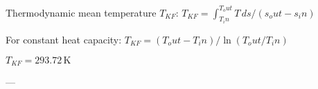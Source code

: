 Thermodynamic mean temperature \( T_{KF} \):  
\( T_{KF} = \int_{T_in}^{T_out} T \, ds / (s_out - s_in) \)  

For constant heat capacity:  
\( T_{KF} = (T_out - T_in) / \ln(T_out / T_in) \)  

\( T_{KF} = 293.72 \, \text{K} \)  

---